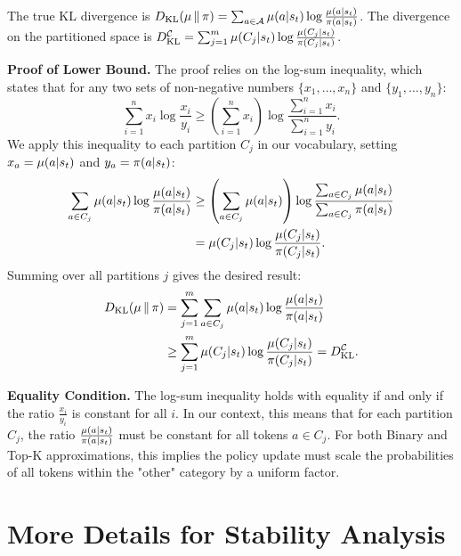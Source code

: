 The true KL divergence is $D_{\mathrm{KL}}(\operatorname*{{\textcolor{black}{\mu}}} \| \operatorname*{{\textcolor{black}{\pi}}}) = \sum_{a \in \mathcal{A}} \operatorname*{{\textcolor{black}{\mu}}}(a|s_t) \log \frac{\operatorname*{{\textcolor{black}{\mu}}}(a|s_t)}{\operatorname*{{\textcolor{black}{\pi}}}(a|s_t)}$. The divergence on the partitioned space is $D_{\mathrm{KL}}^{\mathcal{C}} = \sum_{j=1}^m \operatorname*{{\textcolor{black}{\mu}}}(C_j|s_t) \log \frac{\operatorname*{{\textcolor{black}{\mu}}}(C_j|s_t)}{\operatorname*{{\textcolor{black}{\pi}}}(C_j|s_t)}$.  
  
\textbf{Proof of Lower Bound.}  
The proof relies on the log-sum inequality, which states that for any two sets of non-negative numbers $\{x_1, \dots, x_n\}$ and $\{y_1, \dots, y_n\}$:  
\begin{equation*}  
\sum_{i=1}^n x_i \log \frac{x_i}{y_i} \ge \left(\sum_{i=1}^n x_i\right) \log \frac{\sum_{i=1}^n x_i}{\sum_{i=1}^n y_i}.  
\end{equation*}  
We apply this inequality to each partition $C_j$ in our vocabulary, setting $x_a = \operatorname*{{\textcolor{black}{\mu}}}(a|s_t)$ and $y_a = \operatorname*{{\textcolor{black}{\pi}}}(a|s_t)$:  
\begin{align*}  
\sum_{a \in C_j} \operatorname*{{\textcolor{black}{\mu}}}(a|s_t) \log \frac{\operatorname*{{\textcolor{black}{\mu}}}(a|s_t)}{\operatorname*{{\textcolor{black}{\pi}}}(a|s_t)} &\ge \left(\sum_{a \in C_j} \operatorname*{{\textcolor{black}{\mu}}}(a|s_t)\right) \log \frac{\sum_{a \in C_j} \operatorname*{{\textcolor{black}{\mu}}}(a|s_t)}{\sum_{a \in C_j} \operatorname*{{\textcolor{black}{\pi}}}(a|s_t)} \\  
&= \operatorname*{{\textcolor{black}{\mu}}}(C_j|s_t) \log \frac{\operatorname*{{\textcolor{black}{\mu}}}(C_j|s_t)}{\operatorname*{{\textcolor{black}{\pi}}}(C_j|s_t)}.  
\end{align*}  
Summing over all partitions $j$ gives the desired result:  
\begin{align*}  
D_{\mathrm{KL}}(\operatorname*{{\textcolor{black}{\mu}}} \| \operatorname*{{\textcolor{black}{\pi}}}) &= \sum_{j=1}^m \sum_{a \in C_j} \operatorname*{{\textcolor{black}{\mu}}}(a|s_t) \log \frac{\operatorname*{{\textcolor{black}{\mu}}}(a|s_t)}{\operatorname*{{\textcolor{black}{\pi}}}(a|s_t)} \\  
&\ge \sum_{j=1}^m \operatorname*{{\textcolor{black}{\mu}}}(C_j|s_t) \log \frac{\operatorname*{{\textcolor{black}{\mu}}}(C_j|s_t)}{\operatorname*{{\textcolor{black}{\pi}}}(C_j|s_t)} = D_{\mathrm{KL}}^{\mathcal{C}}.  
\end{align*}  
  
\textbf{Equality Condition.}  
The log-sum inequality holds with equality if and only if the ratio $\frac{x_i}{y_i}$ is constant for all $i$. In our context, this means that for each partition $C_j$, the ratio $\frac{\operatorname*{{\textcolor{black}{\mu}}}(a|s_t)}{\operatorname*{{\textcolor{black}{\pi}}}(a|s_t)}$ must be constant for all tokens $a \in C_j$. For both Binary and Top-K approximations, this implies the policy update must scale the probabilities of all tokens within the "other" category by a uniform factor.


\section{More Details for Stability Analysis}
\label{app:sanity_test}


